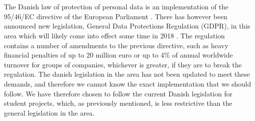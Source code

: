 \\\\
The Danish law of protection of personal data is an implementation of the 95/46/EC directive of the European Parliament \parencite{eu_personal_data_law}. There has however been announced new legislation, General Data Protections Regulation (GDPR), in this area which will likely come into effect some time in 2018 \parencite{eu_data_law_changing}. The regulation contains a number of amendments to the previous directive, such as heavy financial penalties of up to 20 million euro or up to 4\% of annual worldwide turnover for groups of companies, whichever is greater, if they are to break the regulation. The danish legislation in the area has not been updated to meet these demands, and therefore we cannot know the exact implementation that we should follow. We have therefore chosen to follow the current Danish legislation for student projects, which, as previously mentioned, is less restrictive than the general legislation in the area. 
